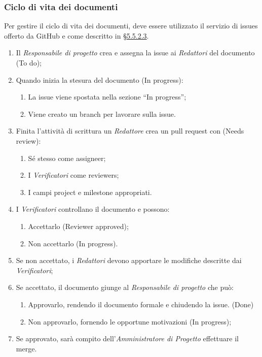 \subsubsection{Ciclo di vita dei documenti}
Per gestire il ciclo di vita dei documenti, deve essere utilizzato il servizio di issues offerto da GitHub e come descritto in \hyperref[sec:projectboard]{§5.5.2.3}.
\begin{enumerate}
\item Il \textit{Responsabile di progetto} crea e assegna la issue ai \textit{Redattori} del documento (To do);
\item Quando inizia la stesura del documento (In progress):
	\begin{enumerate}
		\item La issue viene spostata nella sezione “In progress”;
		\item Viene creato un branch per lavorare sulla issue.
	\end{enumerate}
\item Finita l'attività di scrittura un \textit{Redattore} crea un {pull request} con (Needs review):
	\begin{enumerate}
		\item Sé stesso come assigneer;
		\item I \textit{Verificatori} come reviewers;
		\item I campi project e milestone appropriati.
	\end{enumerate} 
\item I \textit{Verificatori} controllano il documento e possono:
	\begin{enumerate}
	 	\item Accettarlo (Reviewer approved);
	 	\item Non accettarlo (In progress).
	\end{enumerate}
\item Se non accettato, i \textit{Redattori} devono apportare le modifiche descritte dai \textit{Verificatori};
\item Se accettato, il documento giunge al \textit{Responsabile di progetto} che può:
\begin{enumerate}
	\item Approvarlo, rendendo il documento formale e chiudendo la issue. (Done)
	\item Non approvarlo, fornendo le opportune motivazioni (In progress);
\end{enumerate}
\item Se approvato, sarà compito dell'\textit{Amministratore di Progetto} effettuare il merge.
\end{enumerate}
